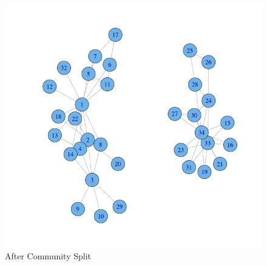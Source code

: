 \documentclass{article}
\begin{document}
\begin{figure}[H]
\centering
\includegraphics[scale=0.50]{q1/step18}
\caption{After Community Split}
\label{after}
\end{figure}
\end{document}

